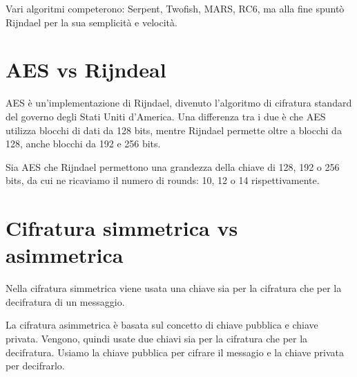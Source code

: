     

\textsf{\small Vari algoritmi competerono: Serpent, Twofish, MARS, RC6, ma alla fine spuntò Rijndael per la sua semplicità e velocità.} %



\section{AES vs Rijndeal}

 

\textsf{\small AES è un'implementazione di Rijndael, divenuto l'algoritmo di cifratura standard del governo degli Stati Uniti d'America.}
\textsf{\small Una differenza tra i due è che AES utilizza blocchi di dati da 128 bits, mentre Rijndael permette oltre a blocchi da 128, anche blocchi da 192 e 256 bits.} %

 

\textsf{\small Sia AES che Rijndael permettono una grandezza della chiave di 128, 192 o 256 bits, da cui ne ricaviamo il numero di rounds: 10, 12 o 14 rispettivamente.}



\section{Cifratura simmetrica vs asimmetrica}

 

\textsf{\small Nella cifratura simmetrica viene usata una chiave sia per la cifratura che per la decifratura di un messaggio.}

 

\textsf{\small La cifratura asimmetrica è basata sul concetto di chiave pubblica e chiave privata. Vengono, quindi usate due chiavi sia per la cifratura che per la decifratura. Usiamo la chiave pubblica per cifrare il messagio e la chiave privata per decifrarlo.} %

